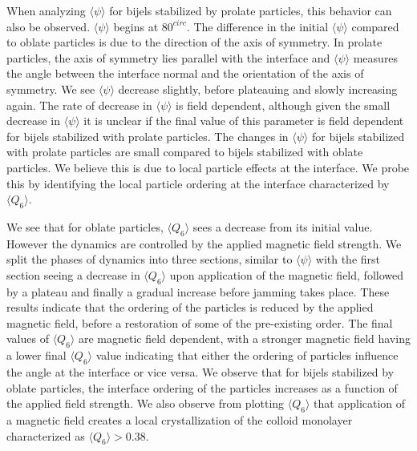 When analyzing \(\langle \psi \rangle\) for bijels stabilized by prolate
particles, this behavior can also be observed. \(\langle \psi \rangle\)
begins at \(80 ^{circ}\). The difference in the initial
\(\langle \psi \rangle\) compared to oblate particles is due to the
direction of the axis of symmetry. In prolate particles, the axis of
symmetry lies parallel with the interface and \(\langle \psi \rangle\)
measures the angle between the interface normal and the orientation of
the axis of symmetry. We see \(\langle \psi \rangle\) decrease slightly,
before plateauing and slowly increasing again. The rate of decrease in
\(\langle \psi \rangle\) is field dependent, although given the small
decrease in \(\langle \psi \rangle\) it is unclear if the final value of
this parameter is field dependent for bijels stabilized with prolate
particles. The changes in \(\langle \psi \rangle\) for bijels stabilized
with prolate particles are small compared to bijels stabilized with
oblate particles. We believe this is due to local particle effects at
the interface. We probe this by identifying the local particle ordering
at the interface characterized by \(\langle Q_6 \rangle\).

We see that for oblate particles, \(\langle Q_6 \rangle\) sees a
decrease from its initial value. However the dynamics are controlled by
the applied magnetic field strength. We split the phases of dynamics
into three sections, similar to \(\langle \psi \rangle\) with the first
section seeing a decrease in \(\langle Q_6 \rangle\) upon application of
the magnetic field, followed by a plateau and finally a gradual increase
before jamming takes place. These results indicate that the ordering of
the particles is reduced by the applied magnetic field, before a
restoration of some of the pre-existing order. The final values of
\(\langle Q_6 \rangle\) are magnetic field dependent, with a stronger
magnetic field having a lower final \(\langle Q_6 \rangle\) value
indicating that either the ordering of particles influence the angle at
the interface or vice versa. We observe that for bijels stabilized by
oblate particles, the interface ordering of the particles increases as a
function of the applied field strength. We also observe from plotting
\(\langle Q_6 \rangle\) that application of a magnetic field creates a
local crystallization of the colloid monolayer characterized as
\(\langle Q_6 \rangle > 0.38\). \cite{toxvaerd_role_2020}

